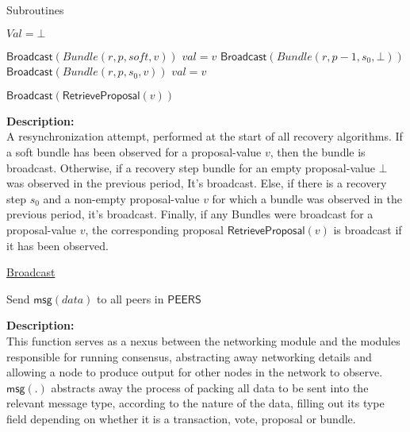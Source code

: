 \documentclass[10pt,a4paper]{article}
\begin{document}
\begin{section}{Subroutines}
\begin{algorithm}[H]
\begin{algorithmic}[1]
    \State $Val = \bot$

        \State $\mathsf{Broadcast}(Bundle(r, p, soft, v))$
        \State $val = v$    
        \State $\mathsf{Broadcast}(Bundle(r, p - 1, s_0, \bot))$
        \State $\mathsf{Broadcast}(Bundle(r, p, s_0, v))$
        \State $val = v$
    \EndIf

        \State $\mathsf{Broadcast}(\mathsf{RetrieveProposal}(v))$
    \EndIf

    \EndFunction
    \end{algorithmic}
\end{algorithm}

\noindent \textbf{Description:}\\
A resynchronization attempt, performed at the start of all recovery algorithms.
If a soft bundle has been observed for a proposal-value $v$, then the bundle is broadcast.
Otherwise, if a recovery step bundle for an empty proposal-value $\bot$ was observed in the previous period,
It's broadcast.
Else, if there is a recovery step $s_0$ and a non-empty proposal-value $v$ for which a bundle was observed in the previous
period, it's broadcast.
Finally, if any Bundles were broadcast for a proposal-value $v$, the corresponding proposal $\mathsf{RetrieveProposal}(v)$ is broadcast
if it has been observed.\\


\begin{algorithm}[H]
    \caption{\underline{Broadcast}}
    \label{algo:broadcast}
    \begin{algorithmic}[1]

    Send $\mathsf{msg}(data)$ to all peers in $\mathsf{PEERS}$

    \EndFunction
    \end{algorithmic}
\end{algorithm}

\noindent \textbf{Description:}\\
This function serves as a nexus between the networking module and the modules responsible
for running consensus, abstracting away networking details and allowing a node to produce
output for other nodes in the network to observe.
$\mathsf{msg}(.)$ abstracts away the process of packing all data to be sent into the relevant message type,
according to the nature of the data, filling out its type field depending on whether it is a transaction, 
vote, proposal or bundle.


\end{section}
\end{document}
